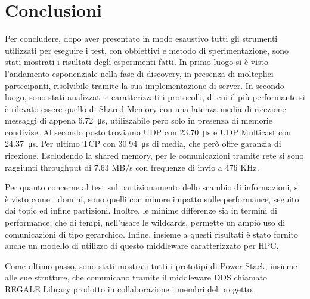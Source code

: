 \chapter{Conclusioni}
Per concludere, dopo aver presentato in modo esaustivo tutti gli strumenti utilizzati per eseguire i test, con obbiettivi e metodo di sperimentazione, sono stati mostrati i risultati degli esperimenti fatti. 
In primo luogo si è visto l'andamento esponenziale nella fase di discovery, in presenza di molteplici partecipanti, risolvibile tramite la sua implementazione di server.
In secondo luogo, sono stati analizzati e caratterizzati i protocolli, di cui il più performante si è rilevato essere quello di Shared Memory con una latenza media di ricezione messaggi di appena \SI{6.72}{\micro\second}, utilizzabile però solo in presenza di memorie condivise.
Al secondo posto troviamo UDP con \SI{23.70}{\micro\second} e UDP Multicast con \SI{24.37}{\micro\second}. Per ultimo TCP con \SI{30.94}{\micro\second} di media, che però offre garanzia di ricezione. Escludendo la shared memory, per le comunicazioni tramite rete si sono raggiunti throughput di 7.63 MB/s con frequenze di invio a 476 KHz.

Per quanto concerne al test sul partizionamento dello scambio di informazioni, si è visto come i domini, sono quelli con minore impatto sulle performance, seguito dai topic ed infine partizioni. Inoltre, le minime differenze sia in termini di performance, che di tempi, nell'usare le wildcards, permette un ampio uso di comunicazioni di tipo gerarchico.
Infine, insieme a questi risultati è stato fornito anche un modello di utilizzo di questo middleware caratterizzato per HPC.

Come ultimo passo, sono stati mostrati tutti i prototipi di Power Stack, insieme alle sue strutture, che comunicano tramite il middleware DDS chiamato REGALE Library prodotto in collaborazione i membri del progetto.
